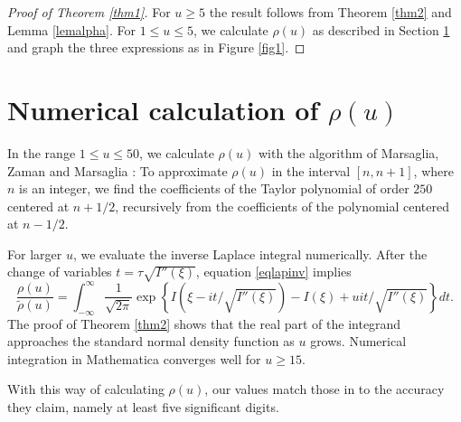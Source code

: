 \documentclass[11pt]{amsart}
\begin{document}
\begin{proof}[Proof of Theorem \ref{thm1}]
For $u\ge 5$ the result follows from Theorem \ref{thm2} and Lemma \ref{lemalpha}.
For $1\le u \le 5$, we calculate $\rho(u)$ as described in Section \ref{SecNum}
and graph the three expressions as in Figure \ref{fig1}.
\end{proof}

\section{Numerical calculation of $\rho(u)$}\label{SecNum}

In the range $1\le u \le 50$, we calculate $\rho(u)$ with the algorithm of Marsaglia, Zaman and Marsaglia \cite{MZM}: 
To approximate $\rho(u)$ in the interval $[n,n+1]$, where $n$ is an integer, 
we find the coefficients of the Taylor polynomial of order $250$ centered
at $n+1/2$, recursively from the coefficients of the polynomial centered at $n-1/2$.

For larger $u$, we evaluate the inverse Laplace integral numerically. After the change of variables $t=\tau \sqrt{I''(\xi)}$,
equation \eqref{eqlapinv} implies
$$
\frac{\rho(u)}{\tilde{\rho}(u)} 
= \int_{-\infty}^\infty \frac{1}{\sqrt{2 \pi}}   \exp\left\{I(\xi-i t/\sqrt{I''(\xi)})-I(\xi)+ui t/\sqrt{I''(\xi)}\right\} dt.
$$
The proof of Theorem \ref{thm2} shows that the real part of the integrand approaches the standard normal density function as $u$ grows.
Numerical integration in Mathematica converges well for $u\ge 15$.

With this way of calculating $\rho(u)$, our values match those in \cite{LunWat} to the accuracy they claim, 
namely at least five significant digits. 
\end{document}
